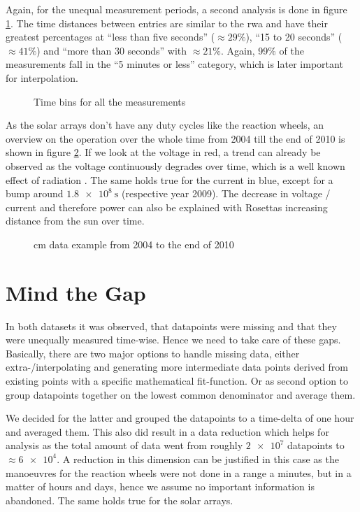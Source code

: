 Again, for the unequal measurement periods, a second analysis is done in figure \ref{f:solar_time_bin}. The time distances between entries are similar to the \ac{rwa} and have their greatest percentages at \enquote{less than five seconds} ($\approx 29\%$), \enquote{15 to 20 seconds} ($\approx 41\%$) and \enquote{more than 30 seconds} with $\approx 21\%$. Again, 99\% of the measurements fall in the \enquote{5 minutes or less} category, which is later important for interpolation.

\begin{figure}[htb]
\centering

\caption{Time bins for all the measurements}
\label{f:solar_time_bin}
\end{figure}

As the solar arrays don't have any duty cycles like the reaction wheels, an overview on the operation over the whole time from 2004 till the end of 2010 is shown in figure \ref{f:solar_example}. If we look at the voltage in red, a trend can already be observed as the voltage continuously degrades over time, which is a well known effect of radiation \cite[p. 45f]{space-handbook}. The same holds true for the current in blue, except for a bump around $\SI{1.8e8}{\second}$ (respective year 2009). \newline
The decrease in voltage / current and therefore power can also be explained with Rosettas increasing distance from the sun over time.

\begin{figure}[H]
\centering

\caption{\ac{cm} data example from 2004  to the end of 2010}
\label{f:solar_example}
\end{figure}

\section{Mind the Gap}
In both datasets it was observed, that datapoints were missing and that they were unequally measured time-wise. Hence we need to take care of these gaps. Basically, there are two major options to handle missing data, either extra-/interpolating and generating more intermediate data points derived from existing points with a specific mathematical fit-function. Or as second option to group datapoints together on the lowest common denominator and average them.

We decided for the latter and grouped the datapoints to a time-delta of one hour and averaged them. This also did result in a data reduction which helps for analysis as the total amount of data went from roughly $\num{2e7}$ datapoints to $\approx \num{6e4}$. A reduction in this dimension can be justified in this case as the manoeuvres for the reaction wheels were not done in a range a minutes, but in a matter of hours and days, hence we assume no important information is abandoned. The same holds true for the solar arrays.


